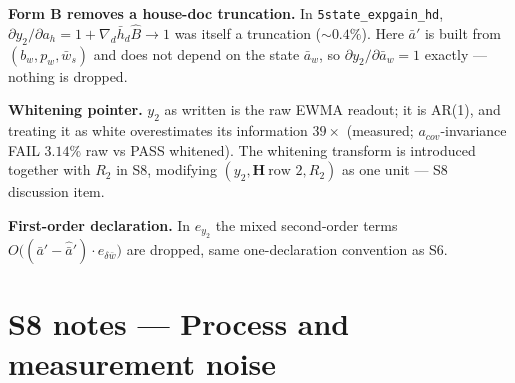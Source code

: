 \documentclass[11pt,a4paper,fontset=none]{ctexart}
\begin{document}
\textbf{Form B removes a house-doc truncation.}  In
\texttt{5state\_expgain\_hd}, $\partial y_2/\partial a_h = 1 +
\nabla_d\bar{h}_d\hat{B} \to 1$ was itself a truncation ($\sim0.4\%$).
Here $\bar{a}'$ is built from $(b_w, p_w, \bar{w}_s)$ and does not depend
on the state $\bar{a}_w$, so $\partial y_2/\partial\bar{a}_w = 1$ exactly
--- nothing is dropped.

\textbf{Whitening pointer.}  $y_2$ as written is the raw EWMA readout; it
is AR(1), and treating it as white overestimates its information
$39\times$ (measured; $a_{cov}$-invariance FAIL $3.14\%$ raw vs PASS
whitened).  The whitening transform is introduced together with $R_2$ in
S8, modifying $(y_2, \mathbf{H}\ \text{row 2}, R_2)$ as one unit ---
S8 discussion item.

\textbf{First-order declaration.}  In $e_{y_2}$ the mixed second-order
terms $O\bigl((\bar{a}'-\hat{\bar{a}}')\cdot e_{\delta\bar{w}}\bigr)$ are
dropped, same one-declaration convention as S6.

\section*{S8 notes --- Process and measurement noise}
\end{document}
